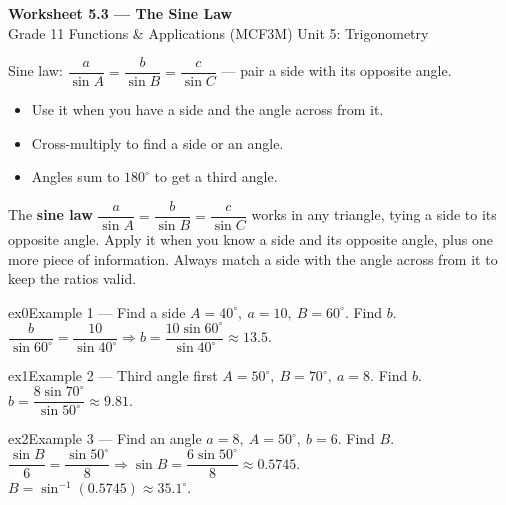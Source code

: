 \documentclass[11pt]{article}
\begin{document}
\begin{center}
{\LARGE\bfseries\color{titleblue}Worksheet 5.3 --- The Sine Law}\\[2pt]
{\small Grade 11 Functions \& Applications (MCF3M) \textperiodcentered{} Unit 5: Trigonometry}
\end{center}

\begin{ideabox}
Sine law: $\dfrac{a}{\sin A}=\dfrac{b}{\sin B}=\dfrac{c}{\sin C}$ — pair a side with its opposite angle.
\begin{itemize}[leftmargin=*,itemsep=2pt]
  \item Use it when you have a side and the angle across from it.
  \item Cross-multiply to find a side or an angle.
  \item Angles sum to $180^\circ$ to get a third angle.
\end{itemize}
\end{ideabox}

\begin{learnbox}
The \textbf{sine law} $\dfrac{a}{\sin A}=\dfrac{b}{\sin B}=\dfrac{c}{\sin C}$ works in any triangle, tying a side to its opposite angle.
Apply it when you know a side and its opposite angle, plus one more piece of information.
Always match a side with the angle across from it to keep the ratios valid.
\end{learnbox}


\begin{example}{ex0}{Example 1 --- Find a side}
$A=40^\circ,\ a=10,\ B=60^\circ$. Find $b$.\soln $\dfrac{b}{\sin60^\circ}=\dfrac{10}{\sin40^\circ}\Rightarrow b=\dfrac{10\sin60^\circ}{\sin40^\circ}\approx13.5$.
\end{example}

\begin{example}{ex1}{Example 2 --- Third angle first}
$A=50^\circ,\ B=70^\circ,\ a=8$. Find $b$.\soln $b=\dfrac{8\sin70^\circ}{\sin50^\circ}\approx9.81$.
\end{example}

\begin{example}{ex2}{Example 3 --- Find an angle}
$a=8,\ A=50^\circ,\ b=6$. Find $B$.\soln $\dfrac{\sin B}{6}=\dfrac{\sin50^\circ}{8}\Rightarrow\sin B=\dfrac{6\sin50^\circ}{8}\approx0.5745$. \\ $B=\sin^{-1}(0.5745)\approx35.1^\circ$.
\end{example}
\end{document}
